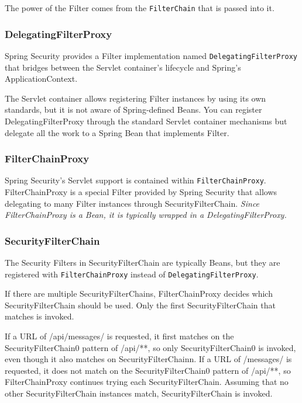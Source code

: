 \documentclass{scrartcl}
\begin{document}
The power of the Filter comes from the \lstinline|FilterChain| that is passed into it.

\subsubsection{DelegatingFilterProxy}

Spring Security provides a Filter implementation named \lstinline|DelegatingFilterProxy| that bridges between the Servlet container’s lifecycle and Spring’s ApplicationContext.

The Servlet container allows registering Filter instances by using its own standards, but it is not aware of Spring-defined Beans. You can register DelegatingFilterProxy through the standard Servlet container mechanisms but delegate all the work to a Spring Bean that implements Filter.

\subsubsection{FilterChainProxy}

Spring Security’s Servlet support is contained within \lstinline|FilterChainProxy|.
FilterChainProxy is a special Filter provided by Spring Security that allows delegating to many Filter instances through SecurityFilterChain.
\textit{Since FilterChainProxy is a Bean, it is typically wrapped in a DelegatingFilterProxy.}

\subsubsection{SecurityFilterChain}

The Security Filters in SecurityFilterChain are typically Beans, but they are registered with \lstinline|FilterChainProxy| instead of \lstinline|DelegatingFilterProxy|.

If there are multiple SecurityFilterChains, FilterChainProxy decides which SecurityFilterChain should be used. Only the first SecurityFilterChain that matches is invoked.

If a URL of /api/messages/ is requested, it first matches on the SecurityFilterChain0 pattern of /api/**, so only SecurityFilterChain0 is invoked, even though it also matches on SecurityFilterChainn. If a URL of /messages/ is requested, it does not match on the SecurityFilterChain0 pattern of /api/**, so FilterChainProxy continues trying each SecurityFilterChain. Assuming that no other SecurityFilterChain instances match, SecurityFilterChain is invoked.
\end{document}
